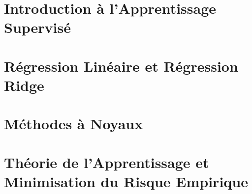 



\chapter{Introduction à l'Apprentissage Supervisé}


\chapter{Régression Linéaire et Régression Ridge}


\chapter{Méthodes à Noyaux}


\chapter{Théorie de l'Apprentissage et Minimisation du Risque Empirique}



\setcounter{chapter}{0}
\renewcommand{\thechapter}{\Alph{chapter}}
\renewcommand{\chaptername}{Annexe}




\renewcommand{\chaptername}{Chapitre}